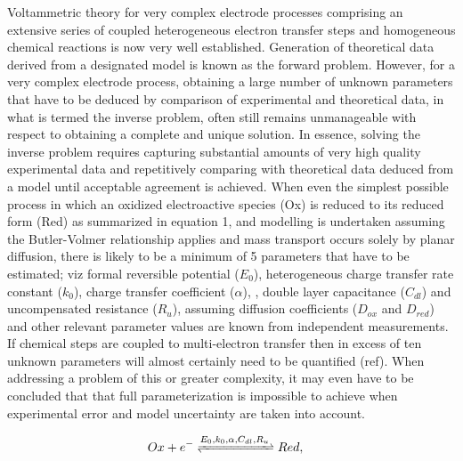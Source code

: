 \documentclass[a4paper, 12pt]{article}
\begin{document}
Voltammetric theory for very complex electrode processes comprising an extensive 
series of coupled heterogeneous electron transfer steps and homogeneous chemical 
reactions is now very well established. Generation of theoretical data derived 
from a designated model is known as the forward problem. However, for a very 
complex electrode process, obtaining a large  number of unknown parameters that 
have to be deduced by comparison of experimental and theoretical data, in what 
is termed the inverse problem, often still remains unmanageable with respect to 
obtaining a complete and unique solution. In essence, solving the inverse 
problem requires capturing substantial amounts of very high quality experimental 
data and repetitively comparing with theoretical data deduced from a model until 
acceptable agreement is achieved. When  even the simplest possible  process in 
which  an oxidized electroactive species (Ox) is reduced to its reduced form 
(Red) as  summarized in equation 1,   and modelling is undertaken assuming  the 
Butler-Volmer relationship applies and mass transport occurs solely by planar 
diffusion, there is likely to be a minimum of 5 parameters that have to be 
estimated; viz formal reversible potential ($E_0$), heterogeneous charge 
transfer rate constant ($k_0$), charge transfer coefficient ($\alpha$), , double 
layer capacitance ($C_{dl}$) and uncompensated resistance ($R_u$), assuming 
diffusion coefficients ($D_{ox}$ and $D_{red}$) and other relevant parameter 
values are known from independent measurements. If chemical steps are coupled to 
multi-electron transfer then in excess of ten unknown parameters will almost 
certainly need to be quantified (ref).  When addressing a problem of this or 
greater complexity, it may even have to be concluded that   that full 
parameterization is impossible to achieve when experimental error and model 
uncertainty are taken into account.

\begin{align} \label{eq:reaction}
Ox + e^- \cee{&<=>[E_0,k_0,\alpha, C_{dl}, R_u]} Red,
\end{align}
\end{document}

